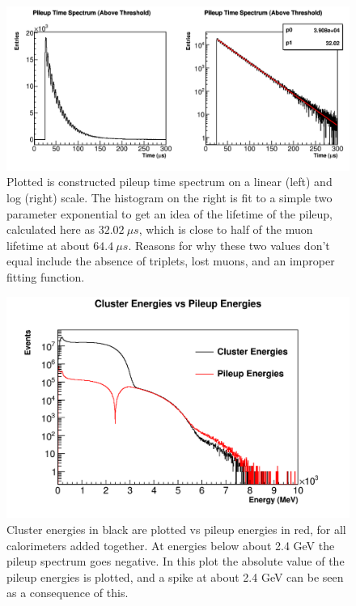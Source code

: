 	\begin{figure}[]
		\centering
		\includegraphics[width=\textwidth]{PileupTimeSpectrum}
	    \caption[PileupTimeSpectrum]{Plotted is constructed pileup time spectrum on a linear (left) and log (right) scale. The histogram on the right is fit to a simple two parameter exponential to get an idea of the lifetime of the pileup, calculated here as $\SI{32.02}{\mu s}$, which is close to half of the muon lifetime at about $\SI{64.4}{\mu s}$. Reasons for why these two values don't equal include the absence of triplets, lost muons, and an improper fitting function.}
	    \label{fig:PileupTimeSpectrum}
	\end{figure}

	\begin{figure}[]
		\centering
		\includegraphics[width=\textwidth]{ClusterEnergiesVsPileupEnergies}
	    \caption[ClusterEnergiesVsPileupEnergies]{Cluster energies in black are plotted vs pileup energies in red, for all calorimeters added together. At energies below about 2.4 GeV the pileup spectrum goes negative. In this plot the absolute value of the pileup energies is plotted, and a spike at about 2.4 GeV can be seen as a consequence of this.}    
	    \label{fig:ClusterEnergiesVsPileupEnergies}
	\end{figure}

